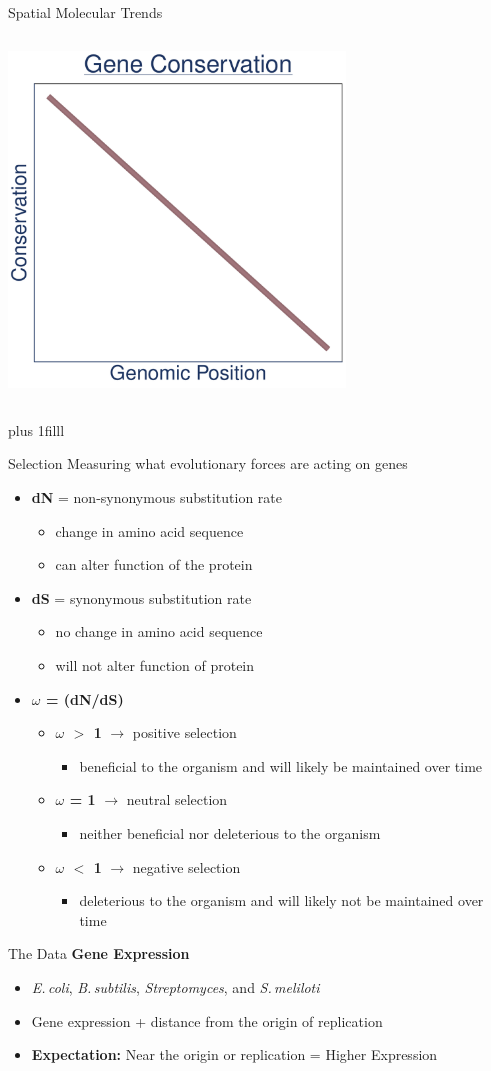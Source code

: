 \documentclass{beamer}
\makeatletter
\newcommand{\bi}{\begin{itemize}}
\newcommand{\ei}{\end{itemize}}
\newcommand{\sourceright}[1]{\begin{textblock*}{}
		\begin{beamercolorbox}[ht=0.5cm,left]{framesource}
			\usebeamerfont{framesource}\usebeamercolor[berry]{framesource}
			{#1}
		\end{beamercolorbox}
	\end{textblock*}}
\newcommand{\itm}{\item<itm@1->}
\newcommand{\btVFill}{\vskip0pt plus 1filll}
\newcommand{\smel}{\textit{S.\,meliloti}\xspace}
\newcommand{\bass}{\textit{B.\,subtilis}\xspace}
\newcommand{\strep}{\textit{Streptomyces}\xspace}
\newcommand{\ecol}{\textit{E.\,coli}\xspace}
\makeatother
\begin{document}
\begin{frame}{Spatial Molecular Trends}
\begin{columns}[t]
		\includegraphics[width=0.67\textwidth]{./cons_graph.pdf}
	\end{columns}
	
	\btVFill
	\tiny \vspace{-\baselineskip}\color{berry}{Couturier et al. 2006, Cooper et al. 2010, Sharp et al. 2005, Morrow et al. 2012, Cooper and Rocha 2006}
	
\end{frame}
\begin{frame}{Selection}
	Measuring what evolutionary forces are acting on genes
	\bi
	\itm \textbf{dN} = non-synonymous substitution rate
		\bi
		\itm change in amino acid sequence
		\itm can alter function of the protein
		\ei
	\itm \textbf{dS} = synonymous substitution rate
		\bi
		\itm no change in amino acid sequence
		\itm will not alter function of protein
		\ei
	\itm \textbf{ $\omega$ = (dN/dS)}
		\bi
		\itm \textbf{$\omega$ $>$ 1} $\rightarrow$ positive selection
			\bi
			\itm beneficial to the organism and will likely be maintained over time
			\ei
		\itm \textbf{$\omega$ = 1} $\rightarrow$ neutral selection
			\bi
			\itm neither beneficial nor deleterious to the organism
			\ei
		\itm \textbf{$\omega$ $<$ 1} $\rightarrow$ negative selection
			\bi
			\itm deleterious to the organism and will likely not be maintained over time
			\ei
		\ei
	\ei
\end{frame}
\begin{frame}[t]{The Data}
			\textbf{Gene Expression}
			\bi
			\itm \ecol, \bass, \strep, and \smel
			\itm Gene expression + distance from the origin of replication
			\itm \textbf{Expectation:} Near the origin or replication = Higher Expression
			\ei
		
\end{frame}
\end{document}
